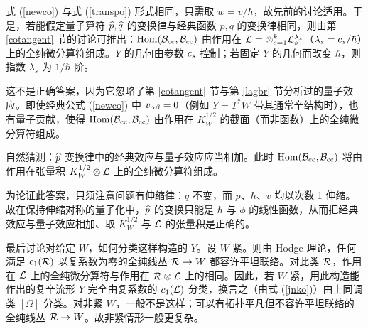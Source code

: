式 (\ref{newco}) 与式 (\ref{transpo}) 形式相同，只需取 $w=v/\hbar$，故先前的讨论适用。于是，若能假定量子算符 $\widehat p,\widehat q$ 的变换律与经典函数 $p,q$ 的变换律相同，则由第 \ref{cotangent} 节的讨论可推出：${\mathrm{Hom}}({\mathcal B}_{\mathrm{cc}},{\mathcal B}_{\mathrm{cc}})$ 由作用在 ${\mathcal L}=\otimes_{s=1}^k{\mathcal L}_s^{\lambda_s}$（$\lambda_s=c_s/\hbar$）上的全纯微分算符组成。$Y$ 的几何由参数 $c_s$ 控制；若固定 $Y$ 的几何而改变 $\hbar$，则指数 $\lambda_s$ 为 $1/\hbar$ 阶。

这不是正确答案，因为它忽略了第 \ref{cotangent} 节与第 \ref{lagbr} 节分析过的量子效应。即使经典公式 (\ref{newco}) 中 $v_{\alpha\beta}=0$（例如 $Y=T^*W$ 带其通常辛结构时），也有量子贡献，使得 ${\mathrm{Hom}}({\mathcal B}_{\mathrm{cc}},{\mathcal B}_{\mathrm{cc}})$ 由作用在 $K_W^{1/2}$ 的截面（而非函数）上的全纯微分算符组成。

自然猜测：$\widehat p$ 变换律中的经典效应与量子效应应当相加。此时 ${\mathrm{Hom}}({\mathcal B}_{\mathrm{cc}},{\mathcal B}_{\mathrm{cc}})$ 将由作用在张量积 $K_W^{1/2}\otimes{\mathcal L}$ 上的全纯微分算符组成。

为论证此答案，只须注意问题有伸缩律：$q$ 不变，而 $p$、$\hbar$、$v$ 均以次数 1 伸缩。故在保持伸缩对称的量子化中，$\widehat p$ 的变换只能是 $\hbar$ 与 $\phi$ 的线性函数，从而把经典效应与量子效应相加、取 $K_W^{1/2}$ 与 ${\mathcal L}$ 的张量积是正确的。

最后讨论对给定 $W$，如何分类这样构造的 $Y$。设 $W$ 紧。则由 Hodge 理论，任何满足 $c_1({\mathcal R})$ 以复系数为零的全纯线丛 ${\mathcal R}\to W$ 都容许平坦联络。对此类 ${\mathcal R}$，作用在 ${\mathcal L}$ 上的全纯微分算符与作用在 ${\mathcal R}\otimes{\mathcal L}$ 上的相同。因此，若 $W$ 紧，用此构造能作出的复辛流形 $Y$ 完全由复系数的 $c_1({\mathcal L})$ 分类，换言之（由式 (\ref{jnko})）由上同调类 $[\Omega]$ 分类。对非紧 $W$，一般不是这样；可以有拓扑平凡但不容许平坦联络的全纯线丛 ${\mathcal R}\to W$。故非紧情形一般更复杂。
